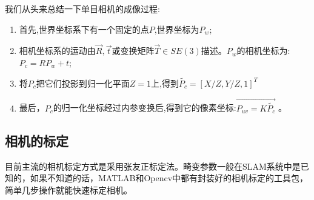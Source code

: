 我们从头来总结一下单目相机的成像过程:
\begin{enumerate}
\item 首先,世界坐标系下有一个固定的点$P$,世界坐标为$P_w$;
\item 相机坐标系的运动由$\vec{R},\vec{t}$或变换矩阵$\vec{T} \in SE(3)$描述。$P_w$的相机坐标为:$P_{c}=R P_{w}+t$;
\item 将$P_c$把它们投影到归一化平面$Z=1$上,得到$\tilde{P_c}=[X / Z, Y / Z, 1]^{T}$
\item 最后，$P_c$的归一化坐标经过内参变换后,得到它的像素坐标:$\vec{P_{uv}=K\tilde{P_c}}$ 。
\end{enumerate}\par
\subsection{相机的标定}
目前主流的相机标定方式是采用张友正标定法\cite{zhang1999flexible}。畸变参数一般在SLAM系统中是已知的，如果不知道的话，MATLAB和Opencv中都有封装好的相机标定的工具包，简单几步操作就能快速标定相机。



